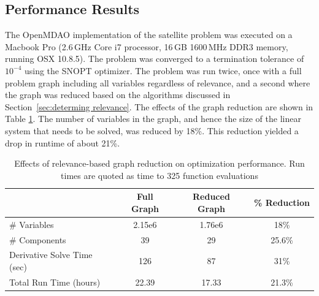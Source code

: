 \documentclass[]{aiaa-tc} %
\begin{document}
        \clearpage


        \subsection{Performance Results}

            The OpenMDAO implementation of the satellite problem was executed on a
            Macbook Pro (2.6\,GHz Core i7 processor, 16\,GB 1600\,MHz DDR3 memory, running OSX 10.8.5).
            The problem was converged to a termination tolerance of $10^{-4}$ using the SNOPT\cite{gill2005snopt} optimizer.
            The problem was run twice, once with a full problem graph including all variables regardless of relevance,
            and a second where the graph was reduced based on the algorithms discussed in Section~\ref{sec:determing relevance}.
            The effects of the graph reduction are shown in Table \ref{tab:cadre-relevance-reduction}. The number of variables in
            the graph, and hence the size of the linear system that needs to be solved, was reduced by 18\%. This reduction 
            yielded a drop in runtime of about 21\%. 



            \begin{table}
                \centering
                \caption{Effects of relevance-based graph reduction on optimization performance. Run times are quoted as time to 
                325 function evaluations}
                  \begin{tabular}{l c c c}
                      \toprule
                                   & Full Graph & Reduced Graph & \% Reduction\\
                      \midrule
                      \# Variables  & 2.15e6 & 1.76e6 & 18\%\\ 
                      \# Components & 39 & 29 & 25.6\%\\ 
                      Derivative Solve Time (sec) & 126 & 87 & 31\%\\ 
                      Total Run Time (hours) & 22.39 & 17.33 & 21.3\%\\ 

                      \bottomrule
                  \end{tabular}
                \label{tab:cadre-relevance-reduction}
            \end{table}
\end{document}
